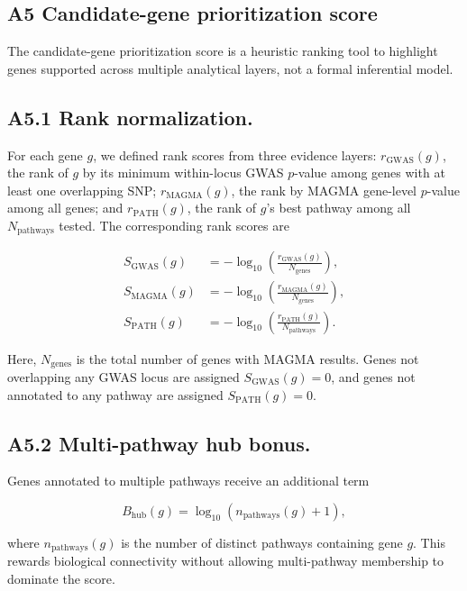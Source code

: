 \documentclass[unnumsec,webpdf,contemporary,large]{oup-authoring-template}%
\theoremstyle{thmstyleone}%
\theoremstyle{thmstyletwo}%
\theoremstyle{thmstylethree}%
\begin{document}
\begin{appendices}
\section{A5 Candidate-gene prioritization score}\label{app:candidate_score}

The candidate-gene prioritization score is a heuristic ranking tool to highlight genes supported across multiple analytical layers, not a formal inferential model.

\subsection{A5.1 Rank normalization.}
For each gene $g$, we defined rank scores from three evidence layers: $r_{\mathrm{GWAS}}(g)$, the rank of $g$ by its minimum within-locus GWAS $p$-value among genes with at least one overlapping SNP; $r_{\mathrm{MAGMA}}(g)$, the rank by MAGMA gene-level $p$-value among all genes; and $r_{\mathrm{PATH}}(g)$, the rank of $g$’s best pathway among all $N_{\mathrm{pathways}}$ tested. The corresponding rank scores are

\[
\begin{aligned}
S_{\mathrm{GWAS}}(g)
&=
-\log_{10}\!\left(
\frac{r_{\mathrm{GWAS}}(g)}{N_{\mathrm{genes}}}
\right),\\
S_{\mathrm{MAGMA}}(g)
&=
-\log_{10}\!\left(
\frac{r_{\mathrm{MAGMA}}(g)}{N_{\mathrm{genes}}}
\right),\\
S_{\mathrm{PATH}}(g)
&=
-\log_{10}\!\left(
\frac{r_{\mathrm{PATH}}(g)}{N_{\mathrm{pathways}}}
\right).
\end{aligned}
\]

Here, $N_{\mathrm{genes}}$ is the total number of genes with MAGMA results. Genes not overlapping any GWAS locus are assigned $S_{\mathrm{GWAS}}(g)=0$, and genes not annotated to any pathway are assigned $S_{\mathrm{PATH}}(g)=0$.

\subsection{A5.2 Multi-pathway hub bonus.}
Genes annotated to multiple pathways receive an additional term

\[
B_{\mathrm{hub}}(g) = \log_{10}\!\left(n_{\mathrm{pathways}}(g)+1\right),
\]

where $n_{\mathrm{pathways}}(g)$ is the number of distinct pathways containing gene $g$. This rewards biological connectivity without allowing multi-pathway membership to dominate the score.


\end{appendices}
\end{document}
